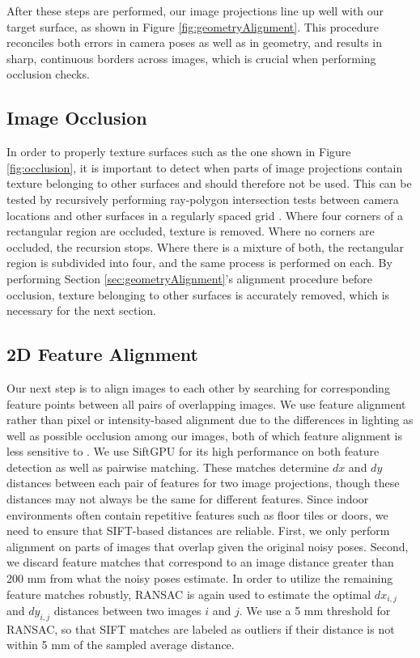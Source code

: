 \documentclass[]{spie}  %
\begin{document}
After these steps are performed, our image projections line up well with our target surface, as shown in Figure \ref{fig:geometryAlignment}. This procedure reconciles both errors in camera poses as well as in geometry, and results in sharp, continuous borders across images, which is crucial when performing occlusion checks.


\subsection{Image Occlusion}
\label{sec:imageOcclusion}
In order to properly texture surfaces such as the one shown in Figure
\ref{fig:occlusion}, it is important to detect when parts of image
projections contain texture belonging to other surfaces and should
therefore not be used. This can be tested by recursively performing
ray-polygon intersection tests between camera locations and other
surfaces in a regularly spaced grid \cite{rayintersection}. Where four
corners of a rectangular region are occluded, texture is
removed. Where no corners are occluded, the recursion stops. Where
there is a mixture of both, the rectangular region is subdivided into
four, and the same process is performed on each. By performing Section
\ref{sec:geometryAlignment}'s alignment procedure before occlusion,
texture belonging to other surfaces is accurately removed, which is
necessary for the next section.

\subsection{2D Feature Alignment}
\label{sec:robustSIFTFeatureMatching}
Our next step is to align images to each other by searching for
corresponding feature points between all pairs of overlapping
images. We use feature alignment rather than pixel or intensity-based
alignment due to the differences in lighting as well as possible
occlusion among our images, both of which feature alignment is less
sensitive to \cite{lowe1999object, mikolajczyk2005performance,
  szeliski2006image}.  We use SiftGPU \cite{siftgpu} for its high
performance on both feature detection as well as pairwise
matching. These matches determine $dx$ and $dy$ distances between each
pair of features for two image projections, though these distances may
not always be the same for different features. Since indoor
environments often contain repetitive features such as floor tiles or
doors, we need to ensure that SIFT-based distances are
reliable. First, we only perform alignment on parts of images that
overlap given the original noisy poses. Second, we discard feature
matches that correspond to an image distance greater than 200 mm from
what the noisy poses estimate. In order to utilize the remaining
feature matches robustly, RANSAC \cite{fischler1981random} is again
used to estimate the optimal $dx_{i,j}$ and $dy_{i,j}$ distances
between two images $i$ and $j$. We use a 5 mm threshold for RANSAC, so
that SIFT matches are labeled as outliers if their distance is not
within 5 mm of the sampled average distance.
\end{document}
